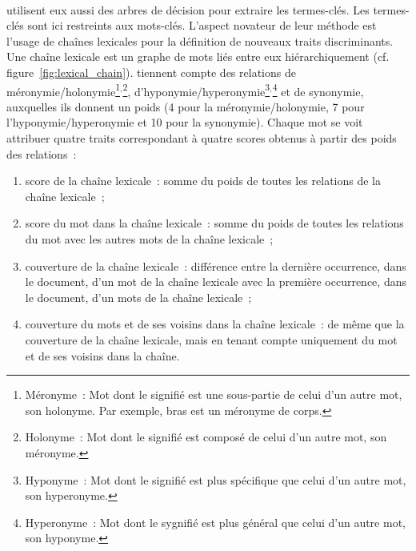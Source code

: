         ~\\ utilisent eux aussi des arbres de
        décision pour extraire les termes-clés. Les termes-clés sont ici
        restreints aux mots-clés. L'aspect novateur de leur méthode est l'usage
        de chaînes lexicales pour la définition de nouveaux traits
        discriminants. Une chaîne lexicale est un graphe de mots liés entre eux
        hiérarchiquement (cf. figure~\ref{fig:lexical_chain}).
         tiennent compte des relations de
        méronymie/holonymie\footnote{Méronyme~: Mot dont le signifié est une
        sous-partie de celui d'un autre mot, son holonyme. Par exemple,
        \og{}bras\fg{} est un méronyme de
        \og{}corps\fg{}.}$^,$\footnote{Holonyme~: Mot dont le signifié est
        composé de celui d'un autre mot, son méronyme.},
        d'hyponymie/hyperonymie\footnote{Hyponyme~: Mot dont le signifié est
        plus spécifique que celui d'un autre mot, son
        hyperonyme.}$^,$\footnote{Hyperonyme~: Mot dont le sygnifié est plus
        général que celui d'un autre mot, son hyponyme.} et de synonymie,
        auxquelles ils donnent un poids (4 pour la méronymie/holonymie, 7 pour
        l'hyponymie/hyperonymie et 10 pour la synonymie). Chaque mot se voit
        attribuer quatre traits correspondant à quatre scores obtenus à partir
        des poids des relations~:
        \begin{enumerate}
          \item{score de la chaîne lexicale~: somme du poids de toutes les
                relations de la chaîne lexicale~;}
          \item{score du mot dans la chaîne lexicale~: somme du poids de toutes
                les relations du mot avec les autres mots de la chaîne
                lexicale~;}
          \item{couverture de la chaîne lexicale~: différence entre la dernière
                occurrence, dans le document, d'un mot de la chaîne lexicale
                avec la première occurrence, dans le document, d'un mots de la
                chaîne lexicale~;}
          \item{couverture du mots et de ses voisins dans la chaîne lexicale~:
                de même que la couverture de la chaîne lexicale, mais en tenant
                compte uniquement du mot et de ses voisins dans la chaîne.}
        \end{enumerate}
